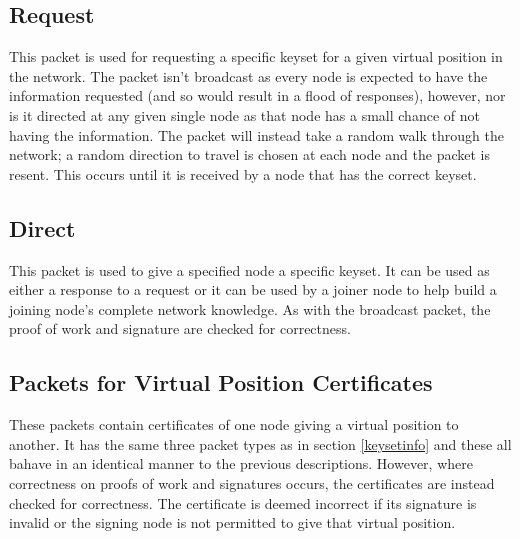\documentclass[ %
                    author={Luke Murray},
                supervisor={Dr. Simon Hollis},
                     title={Shadow Peer-to-Peer Networks},
                  subtitle={},
                    degree={MEng},
                      year={2013} ]{thesis}
\begin{document}
\subsection{Request}

This packet is used for requesting a specific keyset for a given virtual position in the network. The packet isn't broadcast as every node is expected to have the information requested (and so would result in a flood of responses), however, nor is it directed at any given single node as that node has a small chance of not having the information. The packet will instead take a random walk through the network; a random direction to travel is chosen at each node and the packet is resent. This occurs until it is received by a node that has the correct keyset.

\subsection{Direct}

This packet is used to give a specified node a specific keyset. It can be used as either a response to a request or it can be used by a joiner node to help build a joining node's complete network knowledge. As with the broadcast packet, the proof of work and signature are checked for correctness.

\subsection{Packets for Virtual Position Certificates}

These packets contain certificates of one node giving a virtual position to another. It has the same three packet types as in section \ref{keysetinfo} and these all bahave in an identical manner to the previous descriptions. However, where correctness on proofs of work and signatures occurs, the certificates are instead checked for correctness. The certificate is deemed incorrect if its signature is invalid or the signing node is not permitted to give that virtual position.


\end{document}
